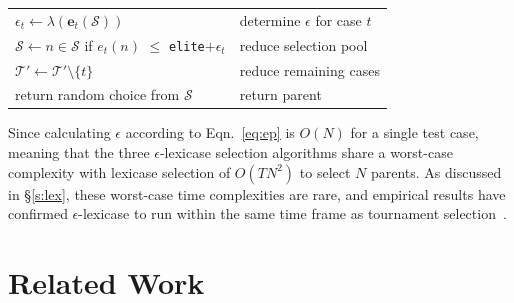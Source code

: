 \documentclass[twoside]{article}
\begin{document}
{\begin{tabularx}{\textwidth}{lX}
\hspace{1em}\hspace{1em}	$\epsilon_t \leftarrow \lambda(\mathbf{e}_t(\mathcal{S}))$	&	\hspace{1em}determine $\epsilon$ for case $t$\\
\hspace{1em}\hspace{1em}	$\mathcal{S} \leftarrow n \in \mathcal{S}$ if $e_t(n)$ $\leq$ \texttt{elite}$+\epsilon_{t}$	&	\hspace{1em}reduce selection pool\\
\hspace{1em}\hspace{1em}	$\mathcal{T'} \leftarrow \mathcal{T'} \setminus \{t\}$				&	\hspace{1em}reduce remaining cases\\
\hspace{1em} return random choice from $\mathcal{S}$															&	return parent  
\end{tabularx}
}
\medskip

Since calculating $\epsilon$ according to Eqn.~\ref{eq:ep} is $O(N)$ for a single test case, meaning that the three $\epsilon$-lexicase selection algorithms share a worst-case complexity with lexicase selection of $O(TN^2)$ to select $N$ parents. As discussed in \S\ref{s:lex}, these worst-case time complexities are rare, and empirical results have confirmed $\epsilon$-lexicase to run within the same time frame as tournament selection~\citep{la_cava_epsilon-lexicase_2016}. %

\section{Related Work}\label{s:rw}
\end{document}
